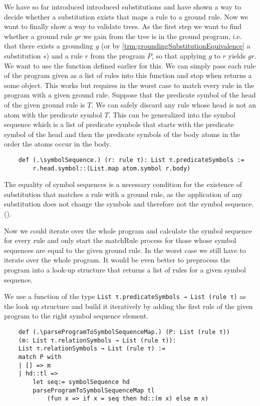 We have so far introduced introduced substitutions and have shown a way to decide whether a substitution exists that maps a rule to a ground rule. Now we want to finally show a way to validate trees. As the first step we want to find whether a ground rule $gr$ we gain from the tree is in the ground program, i.e. that there exists a grounding $g$ (or by \cref{trm:groundingSubstitutionEquivalence} a substitution $s$) and a rule $r$ from the program $P$, so that applying $g$ to $r$ yields $gr$. We want to use the \matchRule function defined earlier for this. 
We can simply pass each rule of the program given as a list of rules into this function and stop when \matchRule returns a some object. This works but requires in the worst case to match every rule in the program with a given ground rule. Suppose that the predicate symbol of the head of the given ground rule is $T$. We can safely discard any rule whose head is not an atom with the predicate symbol $T$. This can be generalized into the symbol sequence which is a list of predicate symbols that starts with the predicate symbol of the head and then the predicate symbols of the body atoms in the order the atoms occur in the body.

\begin{lstlisting}
    def (.\symbolSequence.) (r: rule τ): List τ.predicateSymbols := 
        r.head.symbol::(List.map atom.symbol r.body)

\end{lstlisting}

The equality of symbol sequences is a necessary condition for the existence of substitution that matches a rule with a ground rule, as the application of any substitution does not change the symbols and therefore not the symbol sequence. (\symbolSequenceNotEq).

Now we could iterate over the whole program and calculate the symbol sequence for every rule and only start the matchRule process for those whose symbol sequences are equal to the given ground rule. In the worst case we still have to iterate over the whole program. It would be even better to preprocess  the program into a look-up structure that returns a list of rules for a given symbol sequence.

We use a function of the type \lstinline|List τ.predicateSymbols → List (rule τ)| as the look up structure and build it iteratively by adding the first rule of the given program to the right symbol sequence element.

\begin{lstlisting}
    def (.\parseProgramToSymbolSequenceMap.) (P: List (rule τ)) 
    (m: List τ.relationSymbols → List (rule τ)): 
    List τ.relationSymbols → List (rule τ) :=
    match P with
    | [] => m
    | hd::tl =>
        let seq:= symbolSequence hd
        parseProgramToSymbolSequenceMap tl 
            (fun x => if x = seq then hd::(m x) else m x)
\end{lstlisting}

